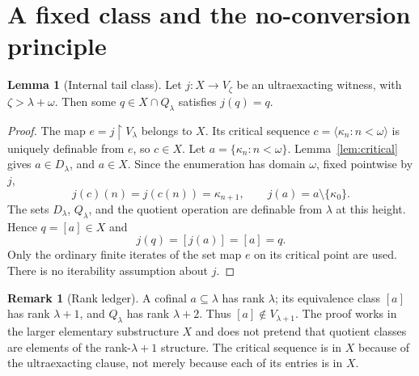 \documentclass[11pt,letterpaper]{article}
\theoremstyle{definition}
\newtheorem{lemma}[definition]{Lemma}
\newtheorem{remark}[definition]{Remark}
\numberwithin{equation}{section}
\newcommand{\restr}{\mathbin{\upharpoonright}}
\newcommand{\D}{D_\lambda}
\newcommand{\Q}{Q_\lambda}
\begin{document}
\section{A fixed class and the no-conversion principle}\label{sec:conversion}

\begin{lemma}[Internal tail class]\label{lem:fixedclass}
Let $j:X\to V_\zeta$ be an ultraexacting witness, with $\zeta>\lambda+\omega$. Then some $q\in X\cap\Q$ satisfies $j(q)=q$.
\end{lemma}
\begin{proof}
The map $e=j\restr V_\lambda$ belongs to $X$. Its critical sequence $c=\langle\kappa_n:n<\omega\rangle$ is uniquely definable from $e$, so $c\in X$. Let $a=\{\kappa_n:n<\omega\}$. Lemma~\ref{lem:critical} gives $a\in\D$, and $a\in X$. Since the enumeration has domain $\omega$, fixed pointwise by $j$,
\[
 j(c)(n)=j(c(n))=\kappa_{n+1},\qquad
 j(a)=a\setminus\{\kappa_0\}.
\]
The sets $\D$, $\Q$, and the quotient operation are definable from $\lambda$ at this height. Hence $q=[a]\in X$ and
\[
 j(q)=[j(a)]=[a]=q.
\]
Only the ordinary finite iterates of the set map $e$ on its critical point are used. There is no iterability assumption about $j$.
\end{proof}

\begin{remark}[Rank ledger]\label{rem:rank}
A cofinal $a\subseteq\lambda$ has rank $\lambda$; its equivalence class $[a]$ has rank $\lambda+1$, and $Q_\lambda$ has rank $\lambda+2$. Thus $[a]\notin V_{\lambda+1}$. The proof works in the larger elementary substructure $X$ and does not pretend that quotient classes are elements of the rank-$\lambda+1$ structure. The critical sequence is in $X$ because of the ultraexacting clause, not merely because each of its entries is in $X$.
\end{remark}
\end{document}
